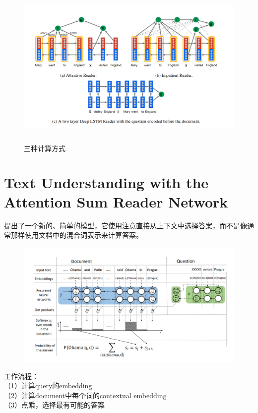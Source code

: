 \documentclass[a4paper,UTF8]{article}
\numberwithin{equation}{section}
\begin{document}
\begin{enumerate}
\begin{figure}[H]
        \includegraphics[height=8cm,width=14cm]{attentive.png}
        \caption{三种计算方式}
    \end{figure}
\end{enumerate}

\newpage
\section{Text Understanding with the Attention Sum Reader Network}
提出了一个新的、简单的模型，它使用注意直接从上下文中选择答案，而不是像通常那样使用文档中的混合词表示来计算答案。
\begin{figure}[H]
    \centering
    \includegraphics[width=\textwidth]{9-1.png}
\end{figure}
工作流程：\\
（1）计算query的embedding\\
（2）计算document中每个词的contextual embedding\\
（3）点乘，选择最有可能的答案


\newpage
\end{document}
